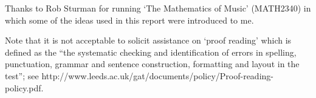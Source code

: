 Thanks to Rob Sturman for running `The Mathematics of Music' (MATH2340) in which
some of the ideas used in this report were introduced to me.

\vspace{1cm}

Note that it is not acceptable to solicit assistance on `proof reading' which is
defined as the ``the systematic checking and identification of errors in
spelling, punctuation, grammar and sentence construction, formatting and layout
in the test''; see http://www.leeds.ac.uk/gat/documents/policy/Proof-reading-policy.pdf.

